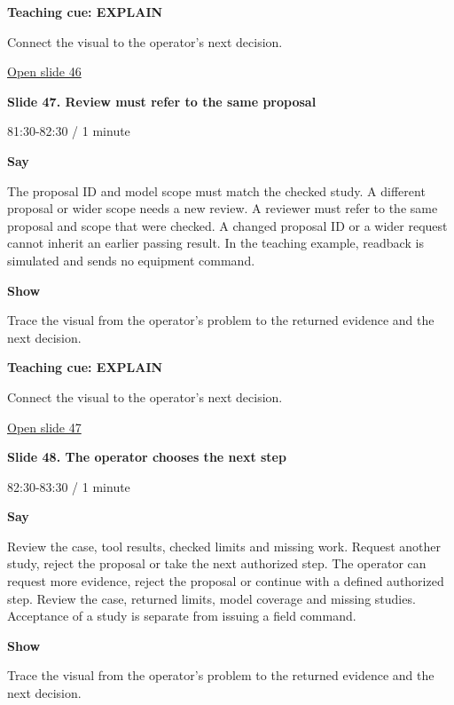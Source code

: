 \documentclass[12pt,letterpaper]{article}
\begin{document}
\textbf{Teaching cue: EXPLAIN}\par Connect the visual to the operator's next decision.\par\medskip
\vfill\href{https://alaaselim-sudo.github.io/GridGuard-Agentic-AI-Tutorials/operator-cases/#/46}{Open slide 46}\par
\clearpage{}
{\Large\bfseries\color{IEEEBlue} Slide 47. Review must refer to the same proposal\par}\medskip
{\small\color{Slate} 81:30-82:30 /\allowbreak{} 1 minute\par}\medskip
\textbf{Say}\par The proposal ID and model scope must match the checked study. A different proposal or wider scope needs a new review. A reviewer must refer to the same proposal and scope that were checked. A changed proposal ID or a wider request cannot inherit an earlier passing result. In the teaching example, readback is simulated and sends no equipment command.\par\medskip
\textbf{Show}\par Trace the visual from the operator's problem to the returned evidence and the next decision.\par\medskip
\textbf{Teaching cue: EXPLAIN}\par Connect the visual to the operator's next decision.\par\medskip
\vfill\href{https://alaaselim-sudo.github.io/GridGuard-Agentic-AI-Tutorials/operator-cases/#/47}{Open slide 47}\par
\clearpage{}
{\Large\bfseries\color{IEEEBlue} Slide 48. The operator chooses the next step\par}\medskip
{\small\color{Slate} 82:30-83:30 /\allowbreak{} 1 minute\par}\medskip
\textbf{Say}\par Review the case, tool results, checked limits and missing work. Request another study, reject the proposal or take the next authorized step. The operator can request more evidence, reject the proposal or continue with a defined authorized step. Review the case, returned limits, model coverage and missing studies. Acceptance of a study is separate from issuing a field command.\par\medskip
\textbf{Show}\par Trace the visual from the operator's problem to the returned evidence and the next decision.\par\medskip
\end{document}
